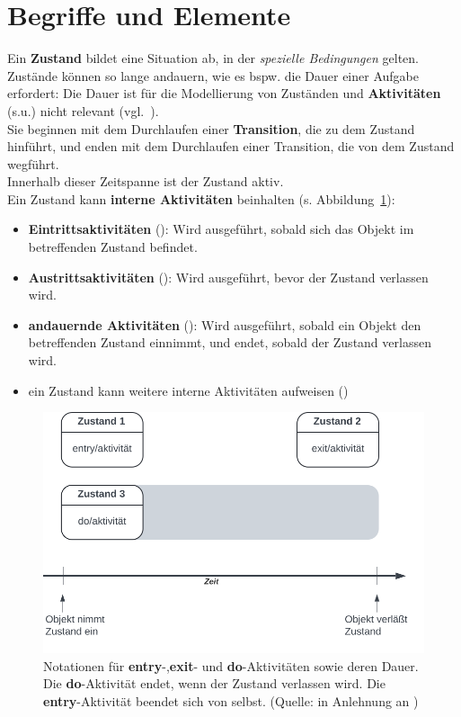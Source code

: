 \section{Begriffe und Elemente}

Ein \textbf{Zustand} bildet eine Situation ab, in der \textit{spezielle Bedingungen} gelten.\\

\noindent
Zustände können so lange andauern, wie es bspw. die Dauer einer Aufgabe erfordert: Die Dauer ist für die Modellierung von Zuständen und \textbf{Aktivitäten} (s.u.) nicht relevant (vgl.~\cite[88]{Bal05}). \\

\noindent
Sie beginnen mit dem Durchlaufen einer \textbf{Transition}, die zu dem Zustand hinführt, und enden mit dem Durchlaufen einer Transition, die von dem Zustand wegführt.\\
Innerhalb dieser Zeitspanne ist der Zustand aktiv.\\

\noindent
Ein Zustand kann \textbf{interne Aktivitäten} beinhalten (s. Abbildung~\ref{fig:entryexitdo}):

\begin{itemize}
    \item \textbf{Eintrittsaktivitäten} (): Wird ausgeführt, sobald sich das Objekt im betreffenden Zustand befindet.
    \item \textbf{Austrittsaktivitäten} (): Wird ausgeführt, bevor der Zustand verlassen wird.
    \item \textbf{andauernde Aktivitäten} (): Wird ausgeführt, sobald ein Objekt den betreffenden Zustand einnimmt, und endet, sobald der Zustand verlassen wird.
    \item ein Zustand kann weitere interne Aktivitäten aufweisen (\cite[69]{Buh09})
\end{itemize}

\begin{figure}
    \centering
    \includegraphics[scale=0.4]{part three/Zustandsautomaten/img/entryexitdo}
    \caption{Notationen für \textbf{entry}-,\textbf{exit}- und \textbf{do}-Aktivitäten sowie deren Dauer. Die \textbf{do}-Aktivität endet, wenn der Zustand verlassen wird. Die \textbf{entry}-Aktivität beendet sich von selbst. (Quelle: in Anlehnung an \cite[89, Abb. 2.11-3]{Bal05})}
    \label{fig:entryexitdo}
\end{figure}

